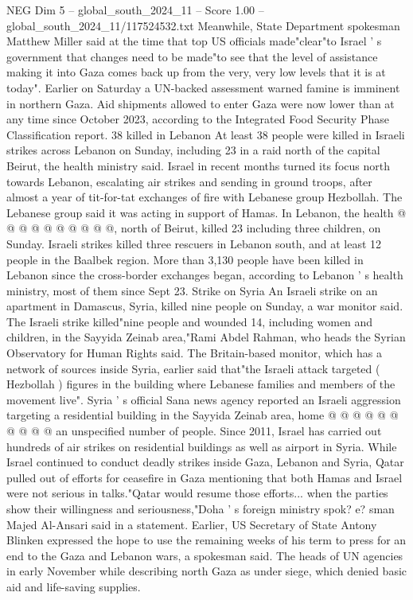 \begin{textsample}{NEG Dim 5 – global\_south\_2024\_11 – Score 1.00 – global\_south\_2024\_11/117524532.txt}  \label{ex:f5_neg_428}
Meanwhile, State Department spokesman Matthew Miller said at the time that top US officials made"clear"to Israel ' s government that changes need to be made"to see that the level of assistance making it into Gaza comes back up from the very, very low levels that it is at today".
Earlier on Saturday a UN-backed assessment warned famine is imminent in northern Gaza.
Aid shipments allowed to enter Gaza were now lower than at any time since October 2023, according to the Integrated Food Security Phase Classification report. 38 killed in Lebanon At least 38 people were killed in Israeli strikes across Lebanon on Sunday, including 23 in a raid north of the capital Beirut, the health ministry said.
Israel in recent months turned its focus north towards Lebanon, escalating air strikes and sending in ground troops, after almost a year of tit-for-tat exchanges of fire with Lebanese group Hezbollah.
The Lebanese group said it was acting in support of Hamas.
In Lebanon, the health @ @ @ @ @ @ @ @ @ @, north of Beirut, killed 23 including three children, on Sunday.
Israeli strikes killed three rescuers in Lebanon south, and at least 12 people in the Baalbek region.
More than 3,130 people have been killed in Lebanon since the cross-border exchanges began, according to Lebanon ' s health ministry, most of them since Sept 23.
Strike on Syria An Israeli strike on an apartment in Damascus, Syria, killed nine people on Sunday, a war monitor said.
The Israeli strike killed"nine people and wounded 14, including women and children, in the Sayyida Zeinab area,"Rami Abdel Rahman, who heads the Syrian Observatory for Human Rights said.
The Britain-based monitor, which has a network of sources inside Syria, earlier said that"the Israeli attack targeted ( Hezbollah ) figures in the building where Lebanese families and members of the movement live".
Syria ' s official Sana news agency reported an Israeli aggression targeting a residential building in the Sayyida Zeinab area, home @ @ @ @ @ @ @ @ @ @ an unspecified number of people.
Since 2011, Israel has carried out hundreds of air strikes on residential buildings as well as airport in Syria.
While Israel continued to conduct deadly strikes inside Gaza, Lebanon and Syria, Qatar pulled out of efforts for ceasefire in Gaza mentioning that both Hamas and Israel were not serious in talks."Qatar would resume those efforts... when the parties show their willingness and seriousness,"Doha ' s foreign ministry spok? e? sman Majed Al-Ansari said in a statement.
Earlier, US Secretary of State Antony Blinken expressed the hope to use the remaining weeks of his term to press for an end to the Gaza and Lebanon wars, a spokesman said.
The heads of UN agencies in early November while describing north Gaza as under siege, which denied basic aid and life-saving supplies.

\end{textsample}
